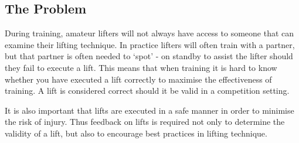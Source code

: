 \subsection{The Problem}

During training, amateur lifters will not always have access to someone that can examine their lifting technique. In practice lifters will often train with a partner, but that partner is often needed to ‘spot’ - on standby to assist the lifter should they fail to execute a lift. This means that when training it is hard to know whether you have executed a lift correctly to maximise the effectiveness of training. A lift is considered correct should it be valid in a competition setting.

It is also important that lifts are executed in a safe manner in order to minimise the risk of injury. Thus feedback on lifts is required not only to determine the validity of a lift, but also to encourage best practices in lifting technique.
